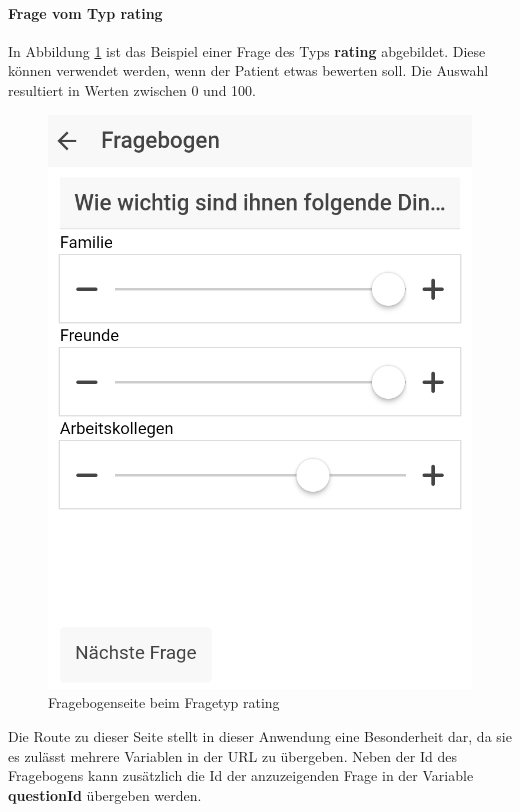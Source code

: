 \paragraph{Frage vom Typ rating}
In Abbildung \ref{PatientClient_Fragebogen_rating} ist das Beispiel einer Frage des Typs \textbf{rating} abgebildet. Diese können verwendet werden, wenn der Patient etwas bewerten soll. Die Auswahl resultiert in Werten zwischen 0 und 100.
\begin{figure}[H]
	\centering
	\includegraphics[scale=0.3]{images/Screenshots/PatientClient/Fragebogen_rating}
	\caption[Fragebogenseite beim Fragetyp rating]{Fragebogenseite beim Fragetyp rating}
	\label{PatientClient_Fragebogen_rating}
\end{figure}


Die Route zu dieser Seite stellt in dieser Anwendung eine Besonderheit dar, da sie es zulässt mehrere Variablen in der URL zu übergeben. Neben der Id des Fragebogens kann zusätzlich die Id der anzuzeigenden Frage in der Variable \textbf{questionId} übergeben werden. 


